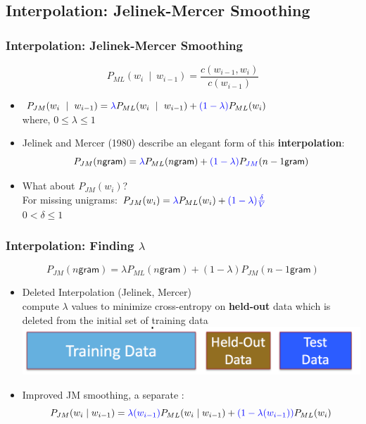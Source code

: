 \subsection{Interpolation: Jelinek-Mercer Smoothing}

\begin{frame}
\frametitle{Interpolation: Jelinek-Mercer Smoothing}
\[ P_{ML}(w_i~\mid~w_{i-1}) = \frac{ c(w_{i-1},w_i) } { c(w_{i-1}) } \]
\begin{itemize}[<+->]
\item $P_{JM}(w_i~\mid~w_{i-1}) = {\color{blue} \lambda} P_{ML}(w_i~\mid~w_{i-1}) +  {\color{blue} (1 - \lambda) }P_{ML}(w_{i})$ \\
 where, $0 \leq \lambda \leq 1$
\item Jelinek and Mercer (1980) describe an elegant form of this {\bf interpolation}:
\[ P_{JM}(\textsf{$n$gram}) = {\color{blue}{\lambda}} P_{ML}(\textsf{$n$gram}) + {\color{blue}{(1 - \lambda)}} P_{\color{blue}{JM}}(\textsf{$n-1$gram}) \]
\item What about $P_{JM}(w_i)$? \\
For missing unigrams: $P_{JM}(w_i) = {\color{blue}{\lambda}} P_{ML}(w_i) + {\color{blue}{(1 - \lambda) \frac{\delta}{V}}}$ \\
$0 < \delta \leq 1$
\end{itemize}
\end{frame}

\begin{frame}
\frametitle{Interpolation: Finding $\lambda$}
\[ P_{JM}(\textsf{$n$gram}) = \lambda P_{ML}(\textsf{$n$gram}) + (1 - \lambda) P_{JM}(\textsf{$n-1$gram}) \]
\begin{itemize}[<+->]
\item Deleted Interpolation (Jelinek, Mercer) \\
compute $\lambda$ values to minimize cross-entropy on {\bf held-out} data which is \alert{deleted} from the initial set of training data
\centering
\includegraphics[scale=.25]{figures/lm/heldout}
\item Improved JM smoothing, a separate : 
\[ P_{JM}(w_i \mid w_{i-1}) = {\color{blue} \lambda(w_{i-1})} P_{ML}(w_i \mid w_{i-1}) + {\color{blue} (1 - \lambda(w_{i-1}))} P_{ML}(w_i) \]
\end{itemize}
\end{frame}

